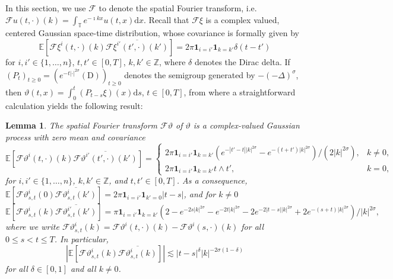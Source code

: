 \documentclass[11pt,a4paper]{article}
\newcommand{\mathD}{\mathrm{D}}
\newcommand{\mathd}{\mathrm{d}}
\newtheorem{lemma}[theorem]{Lemma}
\theoremstyle{remark}
\newcommand{\Z}{\mathbb{Z}}
\newcommand{\E}{\mathbb{E}}
\newcommand{\CF}{\ensuremath{\mathscr{F}}}
\begin{document}
In this section, we use $\CF$ to denote the spatial Fourier transform, i.e. $\CF u(t,\cdot) (k) = \int_\mathbb{T} e^{-\imath k x} u(t,x) \mathd x$. Recall that $\CF \xi$ is a complex valued, centered Gaussian space-time distribution, whose covariance is formally given by
\[
   \E[\CF \xi^i (t,\cdot)(k) \overline{\CF \xi^{i'} (t',\cdot)(k')}] = 2\pi \mathbf{1}_{i=i'} \mathbf{1}_{k=k'} \delta(t - t')
\]
for $i,i'\in \{1, \dots, n\}$, $t, t' \in [0,T]$, $k, k' \in \Z$, where $\delta$ denotes the Dirac delta. If $(P_t)_{t\geqslant 0} = (e^{-t |\cdot|^{2\sigma}}(\mathD))_{t \geqslant 0}$ denotes the semigroup generated by $-(-\Delta)^\sigma$, then $\vartheta(t,x) = \int_{0}^t (P_{t-s} \xi)(x)\mathd s$, $t \in [0,T]$, from where a straightforward calculation yields the following result:


\begin{lemma}\label{l:heat covariance}
   The spatial Fourier transform $\CF \vartheta$ of $\vartheta$ is a complex-valued Gaussian process with zero mean and covariance
   \begin{equation*}%
      \E[\CF{\vartheta}^i(t,\cdot)(k) \overline{\CF{\vartheta}^{i'}(t',\cdot)(k')}] = \begin{cases}
                                                                                                       2 \pi \mathbf{1}_{i=i'} \mathbf{1}_{k=k'} (e^{-|t'-t| | k |^{2 \sigma}} - e^{-(t+t')|k|^{2\sigma} })/(2|k|^{2 \sigma}), & k \neq 0,\\
                                                                                                       2\pi \mathbf{1}_{i=i'} \mathbf{1}_{k=k'} t \wedge t', & k = 0,
                                                                                                   \end{cases}
   \end{equation*}
   for $i,i' \in \{1, \dots, n\}$, $k, k' \in \mathbb{Z}$, and $t,t' \in [0,T]$. As a consequence, $\E[\CF{\vartheta}^i_{s,t}(0) \overline{\CF{\vartheta}^{i}_{s,t}(k')}] = 2\pi \mathbf{1}_{i=i'} \mathbf{1}_{k'=0} |t-s|$, and for $k\neq 0$
   \begin{equation*}
      \E[\CF{\vartheta}^i_{s,t}(k) \overline{\CF{\vartheta}^{i'}_{s,t}(k')}] = \pi \mathbf{1}_{i=i'} \mathbf{1}_{k=k'} (2 - e^{-2 s | k |^{2 \sigma}}  - e^{-2 t | k |^{2 \sigma}} - 2 e^{- 2 |t-s| |k|^{2\sigma}} + 2 e^{-(s+t)|k|^{2\sigma}})/|k|^{2 \sigma},
   \end{equation*}
   where we write $\CF{\vartheta}^i_{s,t}(k) = \CF{\vartheta}^i(t,\cdot)(k) - \CF{\vartheta}^i(s,\cdot)(k)$ for all $0 \leqslant s < t \leqslant T$. In particular,
   \begin{equation}
      |\E[\CF{\vartheta}^i_{s,t}(k) \overline{\CF{\vartheta}^{i}_{s,t}(k)}]| \lesssim |t-s|^{\delta} |k|^{-2\sigma(1 - \delta)}
   \end{equation}
   for all $\delta \in [0,1]$ and all $k \neq 0$.
\end{lemma}
\end{document}
